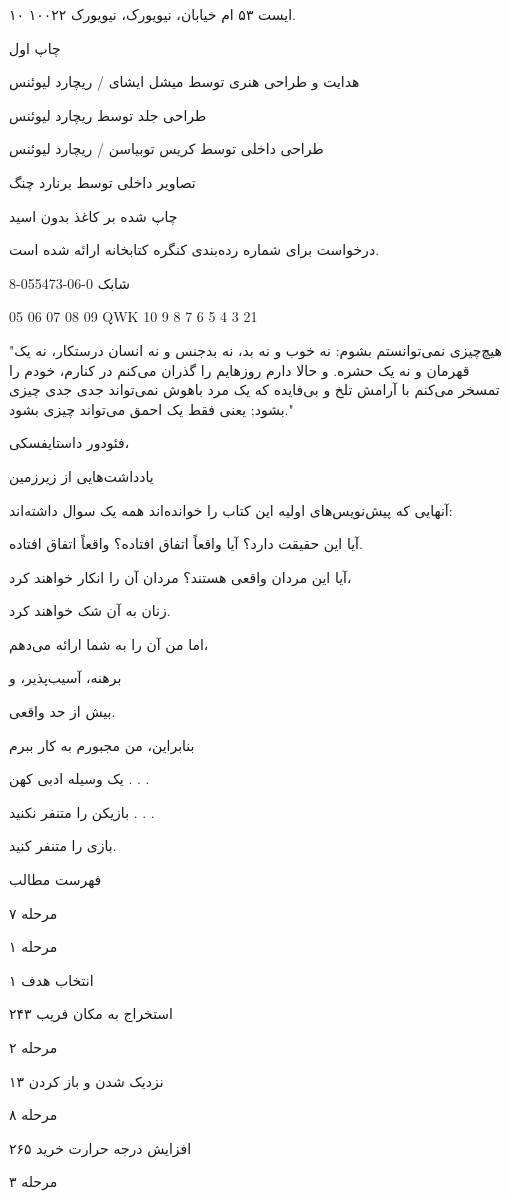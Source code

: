 ۱۰ ایست ۵۳ ام خیابان، نیویورک، نیویورک ۱۰۰۲۲.

چاپ اول

هدایت و طراحی هنری توسط میشل ایشای / ریچارد لیوئنس

طراحی جلد توسط ریچارد لیوئنس

طراحی داخلی توسط کریس توبیاسن / ریچارد لیوئنس

تصاویر داخلی توسط برنارد چنگ

چاپ شده بر کاغذ بدون اسید

درخواست برای شماره رده‌بندی کنگره کتابخانه ارائه شده است.

شابک 0-06-055473-8

05 06 07 08 09 QWK 10 9 8 7 6 5 4 3 21

"هیچ‌چیزی نمی‌توانستم بشوم: نه خوب و نه بد، نه بدجنس و نه انسان درستکار، نه یک قهرمان و نه یک حشره. و حالا دارم روزهایم را گذران می‌کنم در کنارم، خودم را تمسخر می‌کنم با آرامش تلخ و بی‌فایده که یک مرد باهوش نمی‌تواند جدی جدی چیزی بشود; یعنی فقط یک احمق می‌تواند چیزی بشود."

فئودور داستایفسکی،

یادداشت‌هایی از زیرزمین

آنهایی که پیش‌نویس‌های اولیه این کتاب را خوانده‌اند همه یک سوال داشته‌اند:

آیا این حقیقت دارد؟ آیا واقعاً اتفاق افتاده؟ واقعاً اتفاق افتاده.

آیا این مردان واقعی هستند؟ مردان آن را انکار خواهند کرد،

زنان به آن شک خواهند کرد.

اما من آن را به شما ارائه می‌دهم،

برهنه، آسیب‌پذیر، و

بیش از حد واقعی.

بنابراین، من مجبورم به کار ببرم

یک وسیله ادبی کهن . . .

بازیکن را متنفر نکنید . . .

بازی را متنفر کنید.

فهرست مطالب

مرحله ۷

مرحله ۱

انتخاب هدف ۱

استخراج به مکان فریب ۲۴۳

مرحله ۲

نزدیک شدن و باز کردن ۱۳

مرحله ۸

افزایش درجه حرارت خرید ۲۶۵

مرحله ۳

